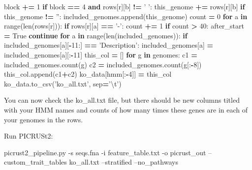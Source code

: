 \documentclass[
]{article}
\newenvironment{Shaded}{\begin{snugshade}}{\end{snugshade}}
\newcommand{\BuiltInTok}[1]{#1}
\newcommand{\CharTok}[1]{\textcolor[rgb]{0.31,0.60,0.02}{#1}}
\newcommand{\ControlFlowTok}[1]{\textcolor[rgb]{0.13,0.29,0.53}{\textbf{#1}}}
\newcommand{\DecValTok}[1]{\textcolor[rgb]{0.00,0.00,0.81}{#1}}
\newcommand{\ExtensionTok}[1]{#1}
\newcommand{\KeywordTok}[1]{\textcolor[rgb]{0.13,0.29,0.53}{\textbf{#1}}}
\newcommand{\NormalTok}[1]{#1}
\newcommand{\OperatorTok}[1]{\textcolor[rgb]{0.81,0.36,0.00}{\textbf{#1}}}
\newcommand{\StringTok}[1]{\textcolor[rgb]{0.31,0.60,0.02}{#1}}
\newcommand{\VariableTok}[1]{\textcolor[rgb]{0.00,0.00,0.00}{#1}}
\begin{document}
\begin{Shaded}
\begin{Highlighting}[]
\NormalTok{                    block }\OperatorTok{+=} \DecValTok{1}
                \ControlFlowTok{if}\NormalTok{ block }\OperatorTok{==} \DecValTok{4} \KeywordTok{and}\NormalTok{ rows[r][b] }\OperatorTok{!=} \StringTok{' '}\NormalTok{:}
\NormalTok{                    this_genome }\OperatorTok{+=}\NormalTok{ rows[r][b]}
            \ControlFlowTok{if}\NormalTok{ this_genome }\OperatorTok{!=} \StringTok{''}\NormalTok{:}
\NormalTok{                included_genomes.append(this_genome)}
\NormalTok{        count }\OperatorTok{=} \DecValTok{0}
        \ControlFlowTok{for}\NormalTok{ a }\KeywordTok{in} \BuiltInTok{range}\NormalTok{(}\BuiltInTok{len}\NormalTok{(rows[r])):}
            \ControlFlowTok{if}\NormalTok{ rows[r][a] }\OperatorTok{==} \StringTok{'-'}\NormalTok{:}
\NormalTok{                count }\OperatorTok{+=} \DecValTok{1}
            \ControlFlowTok{if}\NormalTok{ count }\OperatorTok{>} \DecValTok{40}\NormalTok{:}
\NormalTok{                after_start }\OperatorTok{=} \VariableTok{True}
                \ControlFlowTok{continue}
    \ControlFlowTok{for}\NormalTok{ a }\KeywordTok{in} \BuiltInTok{range}\NormalTok{(}\BuiltInTok{len}\NormalTok{(included_genomes)):}
        \ControlFlowTok{if}\NormalTok{ included_genomes[a][}\OperatorTok{-}\DecValTok{11}\NormalTok{:] }\OperatorTok{==} \StringTok{'Description'}\NormalTok{:}
\NormalTok{            included_genomes[a] }\OperatorTok{=}\NormalTok{ included_genomes[a][:}\OperatorTok{-}\DecValTok{11}\NormalTok{]}
\NormalTok{    this_col }\OperatorTok{=}\NormalTok{ []}
    \ControlFlowTok{for}\NormalTok{ g }\KeywordTok{in}\NormalTok{ genomes:}
\NormalTok{        c1 }\OperatorTok{=}\NormalTok{ included_genomes.count(g)}
\NormalTok{        c2 }\OperatorTok{=}\NormalTok{ included_genomes.count(g[:}\OperatorTok{-}\DecValTok{8}\NormalTok{])}
\NormalTok{        this_col.append(c1}\OperatorTok{+}\NormalTok{c2)}
\NormalTok{    ko_data[hmm[:}\OperatorTok{-}\DecValTok{4}\NormalTok{]] }\OperatorTok{=}\NormalTok{ this_col}
\NormalTok{ko_data.to_csv(}\StringTok{'ko_all.txt'}\NormalTok{, sep}\OperatorTok{=}\StringTok{'}\CharTok{\textbackslash{}t}\StringTok{'}\NormalTok{)}
\end{Highlighting}
\end{Shaded}

You can now check the ko\_all.txt file, but there should be new columns
titled with your HMM names and counts of how many times these genes are
in each of your genomes in the rows.

Run PICRUSt2:

\begin{Shaded}
\begin{Highlighting}[]
\ExtensionTok{picrust2_pipeline.py}\NormalTok{ -s seqs.fna -i feature_table.txt -o picrust_out --custom_trait_tables ko_all.txt --stratified --no_pathways}
\end{Highlighting}
\end{Shaded}
\end{document}
